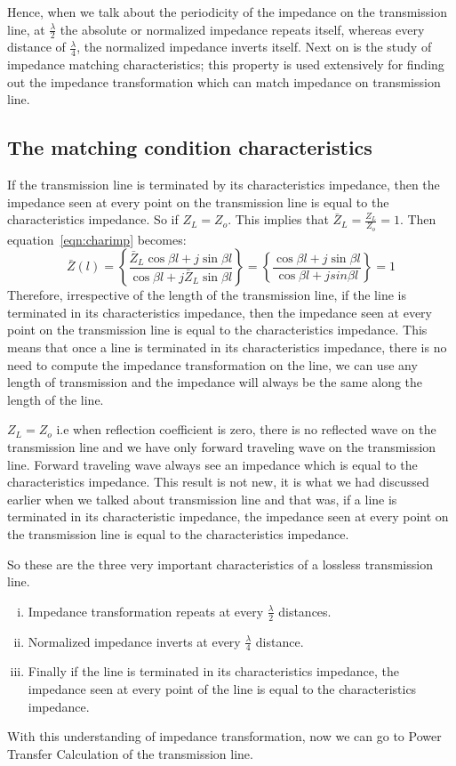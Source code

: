 Hence, when we talk about the periodicity of the impedance on the transmission line, at $\frac{\lambda}{2}$ the absolute or normalized impedance repeats itself, whereas every distance of $\frac{\lambda}{4}$, the normalized impedance inverts itself. Next on is the study of impedance matching characteristics; this property is used extensively for finding out the impedance transformation which can match impedance on transmission line.

\subsection{The matching condition characteristics}
If the transmission line is terminated by its characteristics impedance, then the impedance seen at every point on the transmission line is equal to the characteristics impedance. So if $Z_L=Z_o$. This implies that $\bar{Z}_L= \frac{Z_L}{Z_o}=1$. Then equation~\ref{eqn:charimp} becomes:
\begin{dmath*}
\bar{Z}(l) = \left\lbrace\frac{\bar{Z}_L\cos\beta l + j\sin\beta l}{\cos\beta l + j\bar{Z}_L\sin\beta l}\right\rbrace = \left\lbrace \frac{\cos\beta l + j\sin\beta l}{\cos\beta l + jsin\beta l}\right\rbrace = 1
\end{dmath*}
Therefore, irrespective of the length of the transmission line, if the line is terminated in its characteristics impedance, then the impedance seen at every point on the transmission line is equal to the characteristics impedance. This means that once a line is terminated in its characteristics impedance, there is no need to compute the impedance transformation on the line, we can use any length of transmission and the impedance will always be the same along the length of the line. 

$Z_L=Z_o$ i.e when reflection coefficient is zero, there is no reflected wave on the transmission line and we have only forward traveling wave on the transmission line. Forward traveling wave always see an impedance which is equal to the characteristics impedance. This result is not new, it is what we had discussed earlier when we talked about transmission line and that was, if a line is terminated in its characteristic impedance, the impedance seen at every point on the transmission line is equal to the characteristics impedance. 

So these are the three very important characteristics of a lossless transmission line.
\begin{enumerate}[(i)]
\item Impedance transformation repeats at every $\frac{\lambda}{2}$ distances.
\item Normalized impedance inverts at every $\frac{\lambda}{4}$ distance.
\item Finally if the line is terminated in its characteristics impedance, the impedance seen at every point of the line is equal to the characteristics impedance.
\end{enumerate}
With this understanding of impedance transformation, now we can go to Power Transfer Calculation of the transmission line.

